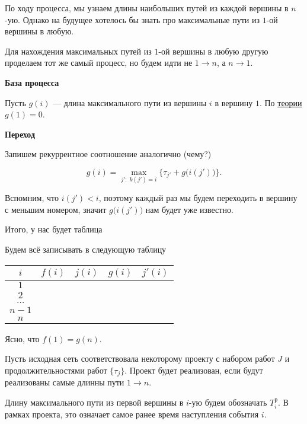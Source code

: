 По ходу процесса, мы узнаем длины наибольших путей из каждой вершины в $n$-ую. Однако на будущее хотелось бы знать про максимальные пути из $1$-ой вершины в любую.


Для нахождения максимальных путей из $1$-ой вершины в любую другую проделаем тот же самый процесс, но будем идти не $1 \to n$, а $n \to 1$.

\textbf{База процесса}

Пусть $g(i)$ --- длина максимального пути из вершины $i$ в вершину $1$. По \hyperref[alg:unknown_step_process]{теории} $g(1) = 0$.

\textbf{Переход}

Запишем рекуррентное соотношение аналогично (чему?)

\[
g(i) = \max_{j': \; k(j') = i} \Big\{\tau_{j'} + g\big(i(j')\big)\Big\}.
\]

Вспомним, что $i(j') < i$, поэтому каждый раз мы будем переходить в вершину с меньшим номером, значит $g\big(i(j')\big)$ нам будет уже известно.

Итого, у нас будет таблица

Будем всё записывать в следующую таблицу

\begin{table}[H]
	\centering
	\begin{tabular}{ | c | c | c | c | c| } 
		\hline
		$i$ & $f(i)$ & $j(i)$ & $g(i)$ & $j'(i)$ \\ 
		\hline
		$1$ &&&&\\\hline
		$2$ &&&& \\\hline
		$\dots$ &&&& \\\hline
		$n-1$ &&&& \\\hline
		$n$ &&&& \\\hline
	\end{tabular}
\end{table}

Ясно, что $f(1) = g(n)$.

\remark

Пусть исходная сеть соответствовала некоторому проекту с набором работ $J$ и продолжительностями работ $\{\tau_j\}$. Проект будет реализован, если будут реализованы самые длинны пути $1 \to n$.


Длину максимального пути из первой вершины в $i$-ую будем обозначать $T_i^{\text{р}}$. В рамках проекта, это означает самое ранее время наступления события $i$.

